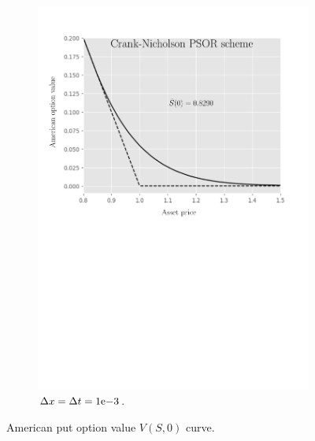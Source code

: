 \begin{figure}[H]
\begin{subfigure}{0.4\textwidth}
    \includegraphics[width=\textwidth]{chapters/chapter5/TestCase4CrankNicholsonLCP.pdf}
    \caption{$\Delta{x}=\Delta{t}={1}\mathrm{e}{-3}$.}
  \end{subfigure}
  \caption{American put option value $V(S, 0)$ curve.}
  \label{fig:lcp:numericaresults:test_case_4}
\end{figure}

